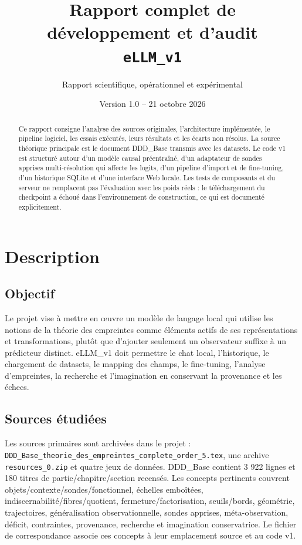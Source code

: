 \documentclass[11pt,a4paper]{article}
\title{Rapport complet de développement et d'audit\\\texttt{eLLM\_v1}}
\author{Rapport scientifique, opérationnel et expérimental}
\date{Version 1.0 -- 21 octobre 2026}
\begin{document}
\maketitle
\begin{abstract}
Ce rapport consigne l'analyse des sources originales, l'architecture implémentée, le pipeline logiciel, les essais exécutés, leurs résultats et les écarts non résolus. La source théorique principale est le document DDD\_Base transmis avec les datasets. Le code v1 est structuré autour d'un modèle causal préentraîné, d'un adaptateur de sondes apprises multi-résolution qui affecte les logits, d'un pipeline d'import et de fine-tuning, d'un historique SQLite et d'une interface Web locale. Les tests de composants et du serveur ne remplacent pas l'évaluation avec les poids réels : le téléchargement du checkpoint a échoué dans l'environnement de construction, ce qui est documenté explicitement.
\end{abstract}
\tableofcontents

\section{Description}
\subsection{Objectif}
Le projet vise à mettre en œuvre un modèle de langage local qui utilise les notions de la théorie des empreintes comme éléments actifs de ses représentations et transformations, plutôt que d'ajouter seulement un observateur suffixe à un prédicteur distinct. eLLM\_v1 doit permettre le chat local, l'historique, le chargement de datasets, le mapping des champs, le fine-tuning, l'analyse d'empreintes, la recherche et l'imagination en conservant la provenance et les échecs.

\subsection{Sources étudiées}
Les sources primaires sont archivées dans le projet : \texttt{DDD\_Base\_theorie\_des\_empreintes\_complete\_order\_5.tex}, une archive \texttt{resources\_0.zip} et quatre jeux de données. DDD\_Base contient 3 922 lignes et 180 titres de partie/chapitre/section recensés. Les concepts pertinents couvrent objets/contexte/sondes/fonctionnel, échelles emboîtées, indiscernabilité/fibres/quotient, fermeture/factorisation, seuils/bords, géométrie, trajectoires, généralisation observationnelle, sondes apprises, méta-observation, déficit, contraintes, provenance, recherche et imagination conservatrice. Le fichier de correspondance associe ces concepts à leur emplacement source et au code v1.
\end{document}
